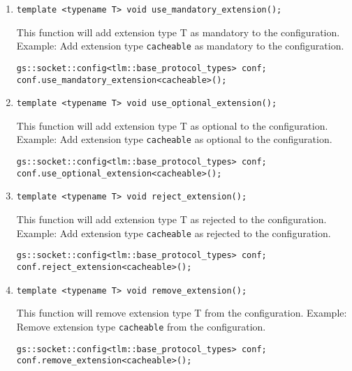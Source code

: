 \documentclass[a4paper,10pt]{article}          %
\begin{document}
\begin{enumerate}
\item 
\verb|template <typename T> void use_mandatory_extension();|

This function will add extension type T as mandatory to the configuration. Example: Add extension type \verb|cacheable| as mandatory to the configuration.

\begin{small}
\begin{verbatim}
gs::socket::config<tlm::base_protocol_types> conf;
conf.use_mandatory_extension<cacheable>();
\end{verbatim}
\end{small}

\item 
\verb|template <typename T> void use_optional_extension();|

This function will add extension type T as optional to the configuration. Example: Add extension type \verb|cacheable| as optional to the configuration.

\begin{small}
\begin{verbatim}
gs::socket::config<tlm::base_protocol_types> conf;
conf.use_optional_extension<cacheable>();
\end{verbatim}
\end{small}

\item 
\verb|template <typename T> void reject_extension();|

This function will add extension type T as rejected to the configuration. Example: Add extension type \verb|cacheable| as rejected to the configuration.

\begin{small}
\begin{verbatim}
gs::socket::config<tlm::base_protocol_types> conf;
conf.reject_extension<cacheable>();
\end{verbatim}
\end{small}

\item 
\verb|template <typename T> void remove_extension();|

This function will remove extension type T from the configuration. Example: Remove extension type \verb|cacheable| from the configuration.

\begin{small}
\begin{verbatim}
gs::socket::config<tlm::base_protocol_types> conf;
conf.remove_extension<cacheable>();
\end{verbatim}
\end{small}


\end{enumerate}
\end{document}

